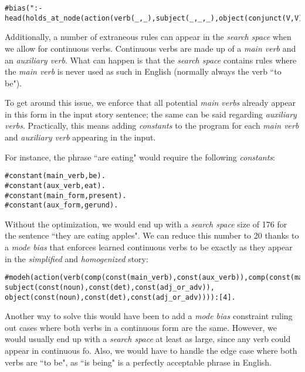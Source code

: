 \begin{displayquote}
\begin{lstlisting}[numbers=none]
#bias(":- head(holds_at_node(action(verb(_,_),subject(_,_,_),object(conjunct(V,V),_,_)),var__(1))).").
\end{lstlisting}
\end{displayquote}

Additionally, a number of extraneous rules can appear in the \textit{search space} when we allow for continuous verbs. Continuous verbs are made up of a \textit{main verb} and an \textit{auxiliary verb}. What can happen is that the \textit{search space} contains rules where the \textit{main verb} is never used as such in English (normally always the verb ``to be").

To get around this issue, we enforce that all potential \textit{main verbs} already appear in this form in the input story sentence; the same can be said regarding \textit{auxiliary verbs}. Practically, this means adding \textit{constants} to the program for each \textit{main verb} and \textit{auxiliary verb} appearing in the input.

For instance, the phrase ``are eating" would require the following \textit{constants}:

\begin{displayquote}
\begin{lstlisting}
#constant(main_verb,be).
#constant(aux_verb,eat).
#constant(main_form,present).
#constant(aux_form,gerund).
\end{lstlisting}
\end{displayquote}

Without the optimization, we would end up with a \textit{search space} size of 176 for the sentence ``they are eating apples". We can reduce this number to 20 thanks to a \textit{mode bias} that enforces learned continuous verbs to be exactly as they appear in the \textit{simplified} and \textit{homogenized} story:

\begin{displayquote}
\begin{lstlisting}[numbers=none]
#modeh(action(verb(comp(const(main_verb),const(aux_verb)),comp(const(main_form),const(aux_form))), subject(const(noun),const(det),const(adj_or_adv)), object(const(noun),const(det),const(adj_or_adv)))):[4].
\end{lstlisting}
\end{displayquote} 

Another way to solve this would have been to add a \textit{mode bias} constraint ruling out cases where both verbs in a continuous form are the same. However, we would usually end up with a \textit{search space} at least as large, since any verb could appear in continuous fo. Also, we would have to handle the edge case where both verbs are ``to be", as ``is being" is a perfectly acceptable phrase in English.

